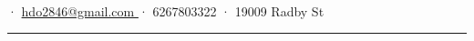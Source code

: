 \documentclass[a4paper,11pt]{article}
\begin{document}
\begin{center}
    {\Huge {}} \\
    {\small  · \href{mailto:hdo2846@gmail.com}{ hdo2846@gmail.com } · 6267803322 · 19009 Radby St
    }
    \\\vspace{0.5cm}
    \hrule
\end{center}
\end{document}
